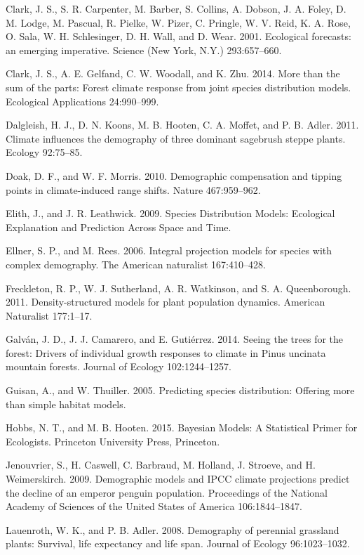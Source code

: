 \documentclass[12pt,]{article}
\begin{document}
Clark, J. S., S. R. Carpenter, M. Barber, S. Collins, A. Dobson, J. A.
Foley, D. M. Lodge, M. Pascual, R. Pielke, W. Pizer, C. Pringle, W. V.
Reid, K. A. Rose, O. Sala, W. H. Schlesinger, D. H. Wall, and D. Wear.
2001. Ecological forecasts: an emerging imperative. Science (New York,
N.Y.) 293:657--660.

Clark, J. S., A. E. Gelfand, C. W. Woodall, and K. Zhu. 2014. More than
the sum of the parts: Forest climate response from joint species
distribution models. Ecological Applications 24:990--999.

Dalgleish, H. J., D. N. Koons, M. B. Hooten, C. A. Moffet, and P. B.
Adler. 2011. Climate influences the demography of three dominant
sagebrush steppe plants. Ecology 92:75--85.

Doak, D. F., and W. F. Morris. 2010. Demographic compensation and
tipping points in climate-induced range shifts. Nature 467:959--962.

Elith, J., and J. R. Leathwick. 2009. Species Distribution Models:
Ecological Explanation and Prediction Across Space and Time.

Ellner, S. P., and M. Rees. 2006. Integral projection models for species
with complex demography. The American naturalist 167:410--428.

Freckleton, R. P., W. J. Sutherland, A. R. Watkinson, and S. A.
Queenborough. 2011. Density-structured models for plant population
dynamics. American Naturalist 177:1--17.

Galv{á}n, J. D., J. J. Camarero, and E. Guti{é}rrez. 2014. Seeing the
trees for the forest: Drivers of individual growth responses to climate
in Pinus uncinata mountain forests. Journal of Ecology 102:1244--1257.

Guisan, A., and W. Thuiller. 2005. Predicting species distribution:
Offering more than simple habitat models.

Hobbs, N. T., and M. B. Hooten. 2015. Bayesian Models: A Statistical
Primer for Ecologists. Princeton University Press, Princeton.

Jenouvrier, S., H. Caswell, C. Barbraud, M. Holland, J. Stroeve, and H.
Weimerskirch. 2009. Demographic models and IPCC climate projections
predict the decline of an emperor penguin population. Proceedings of the
National Academy of Sciences of the United States of America
106:1844--1847.

Lauenroth, W. K., and P. B. Adler. 2008. Demography of perennial
grassland plants: Survival, life expectancy and life span. Journal of
Ecology 96:1023--1032.
\end{document}

